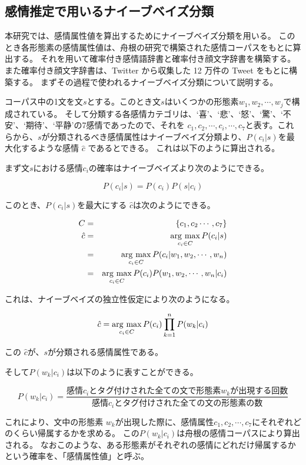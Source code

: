 \documentclass[11pt,a4j]{jsarticle}
\newcommand{\argmax}{\mathop{\rm arg~max}\limits}
\begin{document}
  \subsection{感情推定で用いるナイーブベイズ分類}\label{sec:thesisnaivebayes}
本研究では、感情属性値を算出するためにナイーブベイズ分類を用いる。
このとき各形態素の感情属性値は、舟根の研究で構築された感情コーパスをもとに算出する。
それを用いて確率付き感情語辞書と確率付き顔文字辞書を構築する。
また確率付き顔文字辞書は、Twitter から収集した 12 万件の Tweet をもとに構築する。
まずその過程で使われるナイーブベイズ分類について説明する。

コーパス中の1文を文$s$とする。このとき文$s$はいくつかの形態素$w_1,w_2, \cdots ,w_j$で構成されている。
そして分類する各感情カテゴリは、`喜'、`悲'、`怒'、`驚'、`不安'、`期待'、`平静'の7感情であったので、それを $c_1,c_2, \cdots , c_i, \cdots , c_7$と表す。これらから、$s$が分類されるべき感情属性はナイーブベイズ分類より、$P(c_i|s)$を最大化するような感情 $\hat{c}$ であるとできる。
これは以下のように算出される。

まず文$s$における感情$c_i$の確率はナイーブベイズより次のようにできる。

\[
  P(c_i|s)=P(c_i)P(s|c_i)
\]

このとき、$P(c_i|s)$を最大にする $\hat{c}$は次のようにできる。

\begin{eqnarray*}
C & = & \{c_1,c_2 \cdots ,c_7\}\\
  \hat{c} & = & \argmax_{c_i \in C} P(c_i|s) \\
          & = & \argmax_{c_i \in C} P(c_i|w_1,w_2,\cdots ,w_n) \\
          & = & \argmax_{c_i \in C} P(c_i)P(w_1,w_2,\cdots ,w_n|c_i) \\
\end{eqnarray*}

これは、ナイーブベイズの独立性仮定により次のようになる。

\[
  \hat{c}=\argmax_{c_i \in C} P(c_i)\prod_{k=1}^n P(w_k|c_i)
\]

この $\hat{c}$が、$s$が分類される感情属性である。

そして$P(w_k|c_i)$は以下のように表すことができる。

\[
P(w_k|c_i)=\frac{感情 c_i とタグ付けされた全ての文で形態素 w_k が出現する回数}{感情 c_i とタグ付けされた全ての文の形態素の数}
\]

これにより、文中の形態素 $w_k$が出現した際に、感情属性$c_1,c_2, \cdots ,c_7$にそれぞれどのくらい帰属するかを求める。
この$P(w_k|c_i)$は舟根の感情コーパスにより算出される。
なおこのような、ある形態素がそれぞれの感情にどれだけ帰属するかという確率を、「感情属性値」と呼ぶ。
\end{document}
